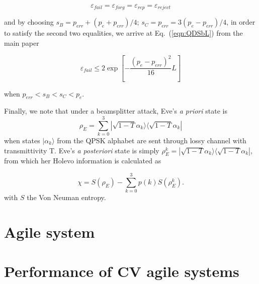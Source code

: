 \begin{equation*}
\varepsilon_{fail} = \varepsilon_{forg} = \varepsilon_{rep} = \varepsilon_{reject}
\end{equation*}

\noindent and by choosing $s_B = p_{err} + \left(p_e + p_{err}\right)/4$; $s_C = p_{err} = 3\left(p_e - p_{err}\right)/4$, in order to satisfy the second two equalities, we arrive at Eq.~(\ref{eqn:QDSbL}) from the main paper

\begin{equation}
\varepsilon_{fail} \le 2 \exp \left[ - \frac{\left( p_e - p_{err} \right)^2}{16} L \right]
\end{equation}

\noindent when $p_{err} < s_B < s_C < p_e$.

Finally, we note that under a beamsplitter attack, Eve's \emph{a priori} state is
\begin{equation}
\rho_E = \sum_{k=0}^3 |\sqrt{1-T}\alpha_k\rangle\langle\sqrt{1-T}\alpha_k|
\end{equation}
when states $|\alpha_k\rangle$ from the QPSK alphabet are sent through lossy channel with transmittivity T. Eve's \emph{a posteriori} state is simply $\rho_{E}^k = |\sqrt{1-T}\alpha_k\rangle\langle \sqrt{1-T}\alpha_k|$, from which her Holevo information is calculated as

\begin{equation}
\chi = S\left(\rho_E\right) - \sum_{k=0}^3 p\left(k\right) S\left(\rho_E^k\right).
\end{equation}
with $S$ the Von Neuman entropy.


\section{Agile system \systemF}

\section{Performance of CV agile systems}
